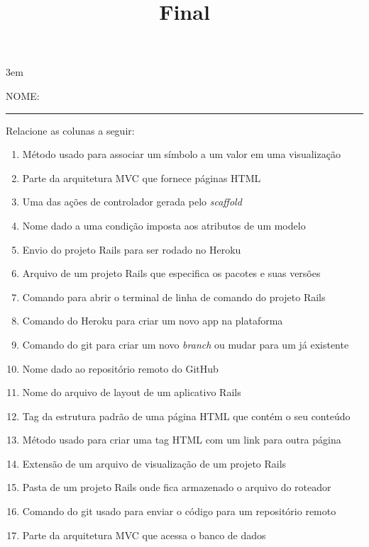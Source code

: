 \documentclass[a4paper,10pt]{article}
\title{Final}
\begin{document}
\maketitle

\emergencystretch 3em

NOME: \rule{.85\textwidth}{0.1mm}

\bigskip

Relacione as colunas a seguir:

\bigskip

\begin{minipage}[c]{0.7\linewidth}
  \setlength{\leftmargini}{0pt}
  \begin{enumerate}[label=(\PaddingUp*),itemsep=.1em]
    \item Método usado para associar um símbolo a um valor em uma visualização
    \item Parte da arquitetura MVC que fornece páginas HTML
    \item Uma das ações de controlador gerada pelo \textit{scaffold}
    \item Nome dado a uma condição imposta aos atributos de um modelo
    \item Envio do projeto Rails para ser rodado no Heroku
    \item Arquivo de um projeto Rails que especifica os pacotes e suas versões
    \item Comando para abrir o terminal de linha de comando do projeto Rails
    \item Comando do Heroku para criar um novo app na plataforma
    \item Comando do git para criar um novo \textit{branch} ou mudar para um já existente
    \item Nome dado ao repositório remoto do GitHub
    \item Nome do arquivo de layout de um aplicativo Rails
    \item Tag da estrutura padrão de uma página HTML que contém o seu conteúdo
    \item Método usado para criar uma tag HTML com um link para outra página
    \item Extensão de um arquivo de visualização de um projeto Rails
    \item Pasta de um projeto Rails onde fica armazenado o arquivo do roteador
    \item Comando do git usado para enviar o código para um repositório remoto
    \item Parte da arquitetura MVC que acessa o banco de dados

\end{enumerate}
\end{minipage}
\end{document}

